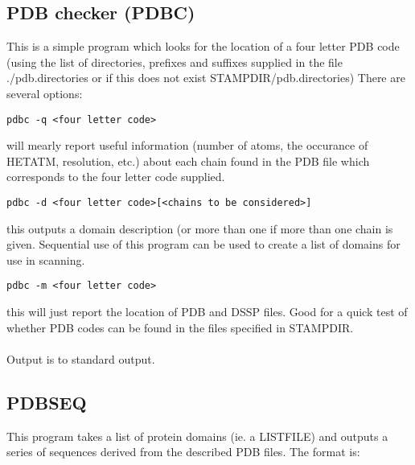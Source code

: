 \subsection{PDB checker (PDBC)}

This is a simple program which looks for the location of a four
letter PDB code (using the list of directories, prefixes and
suffixes supplied in the file ./pdb.directories or if this
does not exist STAMPDIR/pdb.directories)
There are several options:\\

\begin{scriptsize}\begin{verbatim}
pdbc -q <four letter code> 
\end{verbatim} \end{scriptsize}

will mearly report useful information (number of atoms, the occurance of 
HETATM, resolution, etc.) about each chain found in the PDB file which 
corresponds to the four letter code supplied.\\

\begin{scriptsize}\begin{verbatim}
pdbc -d <four letter code>[<chains to be considered>]
\end{verbatim} \end{scriptsize}

this outputs a   domain description (or more than one if more than one 
chain is   given.  Sequential use of this program can be used to create a 
list of domains for use in scanning.\\

\begin{scriptsize}\begin{verbatim}
pdbc -m <four letter code>
\end{verbatim} \end{scriptsize}

this will just report the location of PDB and DSSP files.  Good for a 
quick test of whether PDB codes  can be found in the files specified in 
STAMPDIR.\\
\\
Output is to standard output.

\subsection{PDBSEQ}

This program takes a list of protein domains (ie. a LISTFILE) and
outputs a series of sequences derived from the described PDB
files.  The format is:\\

